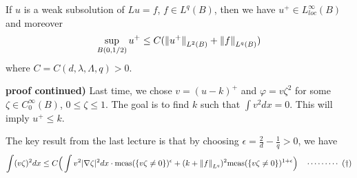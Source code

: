 \documentclass[12pt,a4paper]{article}
\newenvironment{proof}
{\begin{changemargin}{0.5cm}{0.5cm} 
	}%
	{\end{changemargin}
}
\newenvironment{p}
{\begin{proof} 
	}%
	{\end{proof}
}
\begin{document}
\quad If $u$ is a weak subsolution of $Lu = f$, $f\in L^q(B)$, then we have $u^+ \in L_{loc}^{\infty}(B)$ and moreover
\begin{align*}
\sup_{B(0, 1/2)} u^+ \leq C (\snorms{u^+}{L^2(B)} + \snorms{f}{L^q(B)})
\end{align*}
where $C = C(d, \lambda, \Lambda, q)> 0$. 
\begin{p}
\textbf{proof continued)} Last time, we chose $v = (u-k)^+$ and $\varphi = v\zeta^2$ for some $\zeta \in C_0^{\infty}(B)$, $0\leq \zeta \leq 1$. The goal is to find $k$ such that $\int v^2 dx =0$. This will imply $u^+ \leq k$.

\quad The key result from the last lecture is that by choosing $\epsilon = \frac{2}{d}  - \frac{1}{q} >0$, we have
\begin{align*}
\int (v\zeta)^2 dx \leq C \Big( \int v^2 |\nabla \zeta|^2 dx \cdot \text{meas}(\{v\zeta\neq 0 \})^{\epsilon} + (k + \snorms{f}{L^q})^2 \text{meas}(\{v\zeta \neq 0\})^{1+\epsilon} \Big) \call{\dagger}
\end{align*}
\s


\end{p}
\end{document}
